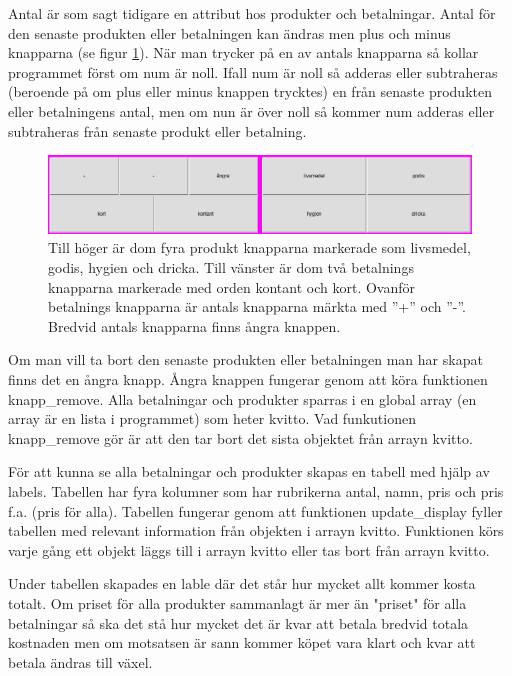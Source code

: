 \documentclass[a4paper, 12pt]{article}
\begin{document}
Antal är som sagt tidigare en attribut hos produkter och betalningar. Antal för den senaste produkten eller betalningen kan ändras men plus och minus knapparna (se figur \ref{fig:3alt}).
När man trycker på en av antals knapparna så kollar programmet först om num är noll. Ifall num är noll så adderas eller subtraheras (beroende på om plus eller minus knappen trycktes) en från senaste produkten eller betalningens antal, men om nun är över noll så kommer num adderas eller subtraheras från senaste produkt eller betalning. 


\begin{figure}[h!]
  \includegraphics[width=\linewidth]{img/3alt.png}
  \caption{
	  Till höger är dom fyra produkt knapparna markerade som livsmedel, godis, hygien och dricka.
	  Till vänster är dom två betalnings knapparna markerade med orden kontant och kort.
	  Ovanför betalnings knapparna är antals knapparna märkta med ''+'' och ''-''.
	  Bredvid antals knapparna finns ångra knappen. 
	}
  \label{fig:3alt}
\end{figure}


Om man vill ta bort den senaste produkten eller betalningen man har skapat finns det en ångra knapp.
Ångra knappen fungerar genom att köra funktionen knapp\_remove. 
Alla betalningar och produkter sparras i en global array (en array är en lista i programmet) som heter kvitto. Vad funkutionen knapp\_remove gör är att den tar bort det sista objektet från arrayn kvitto.


För att kunna se alla betalningar och produkter skapas en tabell med hjälp av labels. Tabellen har fyra kolumner som har rubrikerna antal, namn, pris och pris f.a. (pris för alla).
Tabellen fungerar genom att funktionen update\_display fyller tabellen med relevant information från objekten i arrayn kvitto. Funktionen körs varje gång ett objekt läggs till i arrayn kvitto eller tas bort från arrayn kvitto.


Under tabellen skapades en lable där det står hur mycket allt kommer kosta totalt. Om priset för alla produkter sammanlagt är mer än "priset" för alla betalningar så ska det stå hur mycket det är kvar att betala bredvid totala kostnaden men om motsatsen är sann kommer köpet vara klart och kvar att betala ändras till växel. 
\end{document}
